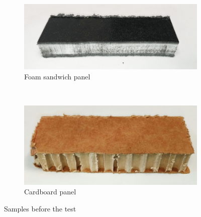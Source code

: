 \begin{figure}[h]
	\begin{subfigure}{0.45\textwidth}
		\includegraphics[width=\textwidth]{img/foam_sandwich.jpg}
		\caption[short caption]{Foam sandwich panel}
		\label{fig:foam_sandwich}
	\end{subfigure}
	~
	\begin{subfigure}{0.45\textwidth}
		\includegraphics[width=\textwidth]{img/cardboard.jpg}
		\caption[short caption]{Cardboard panel}
		\label{fig:cardboard_sandwich}
	\end{subfigure}

	\caption{Samples before the test}
	\label{fig:cmos_transistors}
\end{figure}

